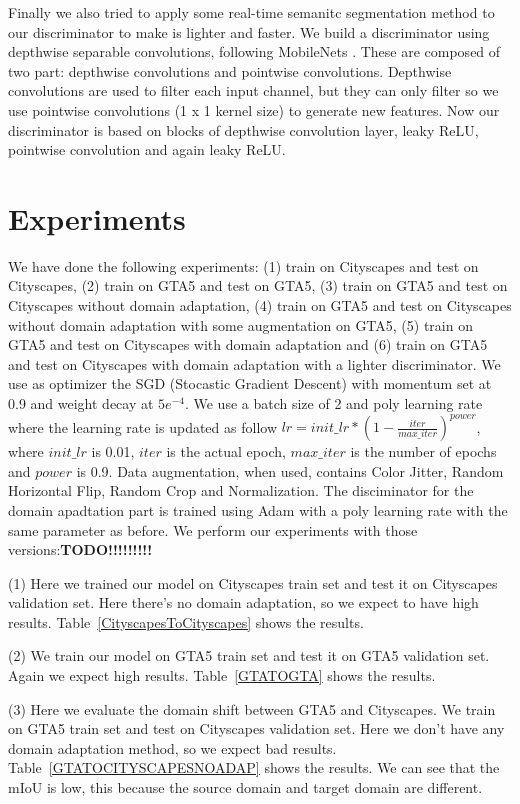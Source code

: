 \documentclass[conference]{IEEEtran}
\begin{document}
Finally we also tried to apply some real-time semanitc segmentation method to our discriminator to make is lighter and faster.
We build a discriminator using depthwise separable convolutions, following MobileNets \cite{b4}. These are composed of two part: 
depthwise convolutions and pointwise convolutions. Depthwise convolutions are used to filter each input channel, but they can
only filter so we use pointwise convolutions (1 x 1 kernel size) to generate new features. Now our discriminator is based on blocks of
depthwise convolution layer, leaky ReLU, pointwise convolution and again leaky ReLU. 

\section{Experiments}

We have done the following experiments: (1) train on Cityscapes and test on Cityscapes, (2) train on GTA5 and test on GTA5, (3) train on 
GTA5 and test on Cityscapes without domain adaptation, (4) train on GTA5 and test on Cityscapes without domain adaptation with some
augmentation on GTA5, (5) train on GTA5 and test on Cityscapes with domain adaptation and (6) train on GTA5 and test on Cityscapes with
domain adaptation with a lighter discriminator. 
We use as optimizer the SGD (Stocastic Gradient Descent) with momentum set at 0.9 and weight decay at \(5e^{-4}\). We use a batch size of 
2 and poly learning rate where the learning rate is updated as follow \(lr = init\_lr * (1 - \frac{iter}{max\_iter})^{power}\), where
\(init\_lr\) is 0.01, \(iter\) is the actual epoch, \(max\_iter\) is the number of epochs and \(power\) is 0.9. Data augmentation, when
used, contains Color Jitter, Random Horizontal Flip, Random Crop and Normalization. The disciminator for the domain apadtation part
is trained using Adam with a poly learning rate with the same parameter as before. 
We perform our experiments with those versions:\textbf{TODO!!!!!!!!!}

(1) Here we trained our model on Cityscapes train set and test it on Cityscapes validation set. Here there's no domain adaptation, so
we expect to have high results. Table~\ref{CityscapesToCityscapes} shows the results.

(2) We train our model on GTA5 train set and test it on GTA5 validation set. Again we expect high results.  
Table~\ref{GTATOGTA} shows the results.

(3) Here we evaluate the domain shift between GTA5 and Cityscapes. We train on GTA5 train set and test on Cityscapes validation set.
Here we don't have any domain adaptation method, so we expect bad results. Table~\ref{GTATOCITYSCAPESNOADAP} shows the results. We can 
see that the mIoU is low, this because the source domain and target domain are different. 
\end{document}
